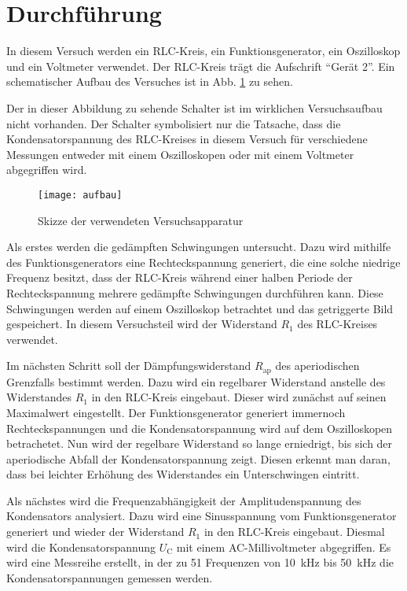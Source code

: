 
\section{Durchführung}
In diesem Versuch werden ein RLC-Kreis, ein Funktionsgenerator, ein
Oszilloskop und ein Voltmeter verwendet. Der RLC-Kreis trägt die
Aufschrift \enquote{Gerät 2}.  Ein schematischer Aufbau des Versuches
ist in Abb. \ref{fig:aufbau} zu sehen.

Der in dieser Abbildung zu sehende Schalter ist im wirklichen
Versuchsaufbau nicht vorhanden. Der Schalter symbolisiert nur die
Tatsache, dass die Kondensatorspannung des RLC-Kreises in diesem Versuch
für verschiedene Messungen entweder mit einem Oszilloskopen oder mit
einem Voltmeter abgegriffen wird.
%
\begin{figure}
\centering
\texttt{[image: aufbau]}
\caption{Skizze der verwendeten Versuchsapparatur}
\label{fig:aufbau}
\end{figure}
%

Als erstes werden die gedämpften Schwingungen untersucht. Dazu wird
mithilfe des Funktionsgenerators eine Rechteckspannung generiert, die
eine solche niedrige Frequenz besitzt, dass der RLC-Kreis während einer
halben Periode der Rechteckspannung mehrere gedämpfte Schwingungen
durchführen kann.  Diese Schwingungen werden auf einem Oszilloskop
betrachtet und das getriggerte Bild gespeichert.  In diesem Versuchsteil
wird der Widerstand $R_1$ des RLC-Kreises verwendet.

Im nächsten Schritt soll der Dämpfungswiderstand $R_\text{ap}$ des
aperiodischen Grenzfalls bestimmt werden. Dazu wird ein regelbarer
Widerstand anstelle des Widerstandes $R_1$ in den RLC-Kreis
eingebaut. Dieser wird zunächst auf seinen Maximalwert eingestellt. Der
Funktionsgenerator generiert immernoch Rechteckspannungen und die
Kondensatorspannung wird auf dem Oszilloskopen betrachetet.  Nun wird
der regelbare Widerstand so lange erniedrigt, bis sich der aperiodische
Abfall der Kondensatorspannung zeigt. Diesen erkennt man daran, dass bei
leichter Erhöhung des Widerstandes ein Unterschwingen eintritt.

Als nächstes wird die Frequenzabhängigkeit der Amplitudenspannung des
Kondensators analysiert. Dazu wird eine Sinusspannung vom
Funktionsgenerator generiert und wieder der Widerstand $R_1$ in den
RLC-Kreis eingebaut.  Diesmal wird die Kondensatorspannung $U_\text{C}$
mit einem AC-Millivoltmeter abgegriffen. Es wird eine Messreihe
erstellt, in der zu 51 Frequenzen von \SI{10}{\kilo\hertz} bis
\SI{50}{\kilo\hertz} die Kondensatorspannungen gemessen werden.

